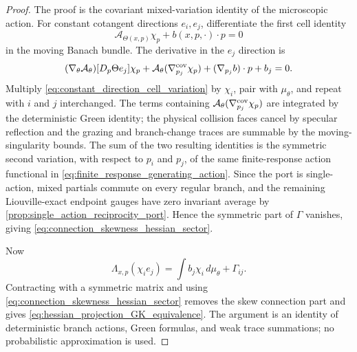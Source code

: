 \documentclass[12pt, letterpaper]{amsart}
\newcommand{\Acal}{\mathcal{A}}
\theoremstyle{plain}
\theoremstyle{definition}
\theoremstyle{remark}
\begin{document}
\begin{proof}
The proof is the covariant mixed-variation identity of the microscopic action.
For constant cotangent directions $e_i,e_j$, differentiate the first cell
identity
\begin{equation}
    \Acal_{\Theta(x,p)}\chi_p+b(x,p,\cdot)\cdot p=0
\end{equation}
in the moving Banach bundle.  The derivative in the $e_j$ direction is
\begin{equation}
\label{eq:constant_direction_cell_variation}
    (\nabla_\theta\Acal_\theta)[D_p\Theta e_j]\chi_p
    +\Acal_\theta(\nabla_{p_j}^{\rm cov}\chi_p)
    +(\nabla_{p_j}b)\cdot p+b_j=0 .
\end{equation}
Multiply \eqref{eq:constant_direction_cell_variation} by $\chi_i$, pair with
$\mu_\theta$, and repeat with $i$ and $j$ interchanged.  The terms containing
$\Acal_\theta(\nabla_{p_j}^{\rm cov}\chi_p)$ are integrated by the deterministic
Green identity; the physical collision faces cancel by specular reflection and
the grazing and branch-change traces are summable by the moving-singularity
bounds.  The sum of the two resulting identities is the symmetric second
variation, with respect to $p_i$ and $p_j$, of the same finite-response action
functional in \eqref{eq:finite_response_generating_action}.  Since the port is
single-action, mixed partials commute on every regular branch, and the remaining
Liouville-exact endpoint gauges have zero invariant average by
\cref{prop:single_action_reciprocity_port}.  Hence the symmetric part of
$\Gamma$ vanishes, giving \eqref{eq:connection_skewness_hessian_sector}.

Now
\begin{equation}
    \Lambda_{x,p}(\chi_i e_j)
    =\int b_j\chi_i\,d\mu_\theta+\Gamma_{ij} .
\end{equation}
Contracting with a symmetric matrix and using
\eqref{eq:connection_skewness_hessian_sector} removes the skew connection part
and gives \eqref{eq:hessian_projection_GK_equivalence}.  The argument is an
identity of deterministic branch actions, Green formulas, and weak trace
summations; no probabilistic approximation is used.
\end{proof}
\end{document}
